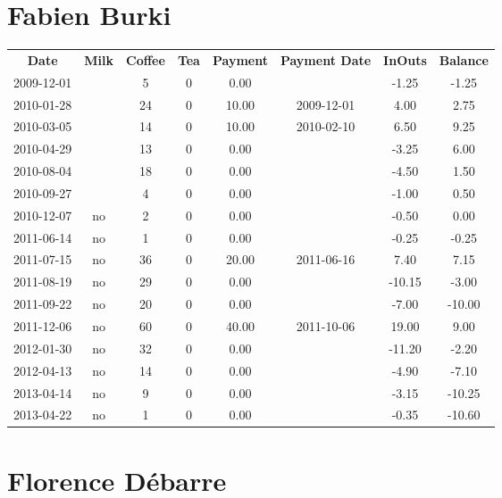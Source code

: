 \section{Fabien Burki}

\begin{center}
\begin{tabular}{cccccccc}
\textbf{Date} & \textbf{Milk} & \textbf{Coffee} & \textbf{Tea} & \textbf{Payment} & \textbf{Payment Date} & \textbf{InOuts} & \textbf{Balance} \\
2009-12-01 &  &  5 & 0 &  0.00 &  &  -1.25 &  -1.25\\ 
2010-01-28 &  & 24 & 0 & 10.00 & 2009-12-01 &   4.00 &   2.75\\ 
2010-03-05 &  & 14 & 0 & 10.00 & 2010-02-10 &   6.50 &   9.25\\ 
2010-04-29 &  & 13 & 0 &  0.00 &  &  -3.25 &   6.00\\ 
2010-08-04 &  & 18 & 0 &  0.00 &  &  -4.50 &   1.50\\ 
2010-09-27 &  &  4 & 0 &  0.00 &  &  -1.00 &   0.50\\ 
2010-12-07 & no &  2 & 0 &  0.00 &  &  -0.50 &   0.00\\ 
2011-06-14 & no &  1 & 0 &  0.00 &  &  -0.25 &  -0.25\\ 
2011-07-15 & no & 36 & 0 & 20.00 & 2011-06-16 &   7.40 &   7.15\\ 
2011-08-19 & no & 29 & 0 &  0.00 &  & -10.15 &  -3.00\\ 
2011-09-22 & no & 20 & 0 &  0.00 &  &  -7.00 & -10.00\\ 
2011-12-06 & no & 60 & 0 & 40.00 & 2011-10-06 &  19.00 &   9.00\\ 
2012-01-30 & no & 32 & 0 &  0.00 &  & -11.20 &  -2.20\\ 
2012-04-13 & no & 14 & 0 &  0.00 &  &  -4.90 &  -7.10\\ 
2013-04-14 & no &  9 & 0 &  0.00 &  &  -3.15 & -10.25\\ 
2013-04-22 & no &  1 & 0 &  0.00 &  &  -0.35 & -10.60
\end{tabular}
\end{center}

\section{Florence D\'ebarre}

